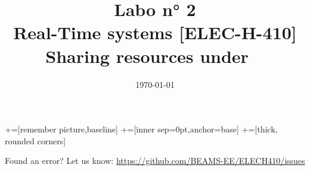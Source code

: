\documentclass[10pt,a4paper]{article}
\date{\vspace{-1cm}\mydate\today}
\title{\vspace{-2cm} Labo n° 2\\ Real-Time systems [ELEC-H-410]\\ Sharing resources under \rtos~\ifthenelse{\boolean{corrige}}{~\\Corrigé}{}}
\theoremstyle{definition}%
\begin{document}
	\newcommand\tabnode[1]{\addtocounter{nodecount}{1} \tikz \node (\arabic{nodecount}) {#1};}

	+=[remember picture,baseline]
	+=[inner sep=0pt,anchor=base]
	+=[thick, rounded corners]



	\maketitle
	

	

	
	
	

	

	
	
    \vfill
    \footnotesize{
        Found an error? Let us know: \url{https://github.com/BEAMS-EE/ELECH410/issues}
    }
    
    \newpage
    
\end{document}
